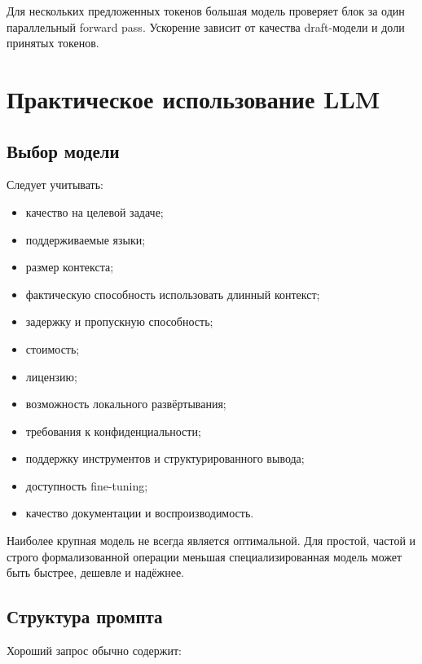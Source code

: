 \documentclass[12pt,a4paper]{article}
\newcommand{\1}{\mathbf{1}}
\theoremstyle{definition}
\theoremstyle{remark}
\begin{document}
Для нескольких предложенных токенов большая модель проверяет блок за
один параллельный forward pass. Ускорение зависит от качества
draft-модели и доли принятых токенов.

\section{Практическое использование LLM}

\subsection{Выбор модели}

Следует учитывать:

\begin{itemize}
    \item качество на целевой задаче;
    \item поддерживаемые языки;
    \item размер контекста;
    \item фактическую способность использовать длинный контекст;
    \item задержку и пропускную способность;
    \item стоимость;
    \item лицензию;
    \item возможность локального развёртывания;
    \item требования к конфиденциальности;
    \item поддержку инструментов и структурированного вывода;
    \item доступность fine-tuning;
    \item качество документации и воспроизводимость.
\end{itemize}

Наиболее крупная модель не всегда является оптимальной. Для простой,
частой и строго формализованной операции меньшая специализированная
модель может быть быстрее, дешевле и надёжнее.

\subsection{Структура промпта}

Хороший запрос обычно содержит:
\end{document}
